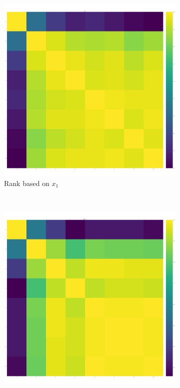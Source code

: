 \documentclass{article}
\begin{document}
\begin{figure}[!htbp]
	\centering
	\begin{subfigure}[t]{.3\textwidth}
		\centering
		\includegraphics[width=.9\textwidth]{../img/correlation_heatmap_invade.pdf}
		\caption{Rank based on \(x_1\)}
    \end{subfigure}
    ~
	\begin{subfigure}[t]{.3\textwidth}
		\centering
		\includegraphics[width=.9\textwidth]{../img/correlation_heatmap_resist.pdf}

\end{subfigure}
\end{figure}
\end{document}
